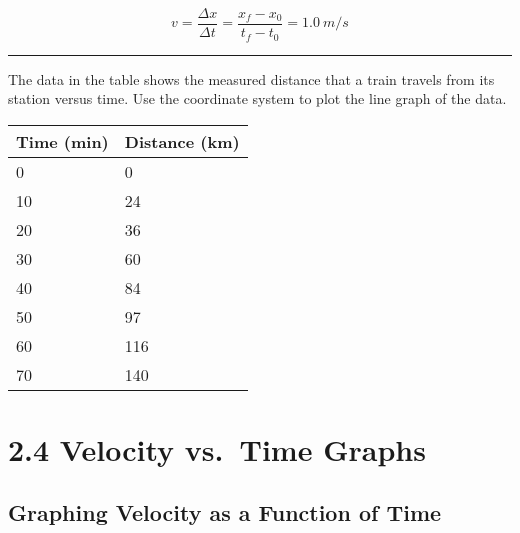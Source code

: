 \documentclass[addpoints]{exam}
\begin{document}
\begin{questions}
\begin{solution}
\begin{equation*}
    v = \frac{\Delta{x}}{\Delta{t}} = \frac{x_f - x_0}{t_f - t_0} = \SI{1.0}{m/s}
\end{equation*}
\end{solution}





\vspace{1em} \hrule

\question
The data in the table shows the measured distance that a train travels from its station versus time. Use the coordinate system to plot the line graph of the data.

\begin{minipage}{0.4\textwidth}
\begin{tabular}{l|l}
    \textbf{Time (min)} & \textbf{Distance (km)} \\
    \hline\hline
    0 & 0\\
    10 & 24\\
    20 & 36\\
    30 & 60\\
    40 & 84\\
    50 & 97\\
    60 & 116\\
    70 & 140\\
\end{tabular}
\end{minipage}\hfill
\begin{minipage}{0.6\textwidth}
\centering
{}
\end{minipage}

\section*{2.4 Velocity vs.~Time Graphs}

\subsection*{Graphing Velocity as a Function of Time}


\end{questions}
\end{document}
